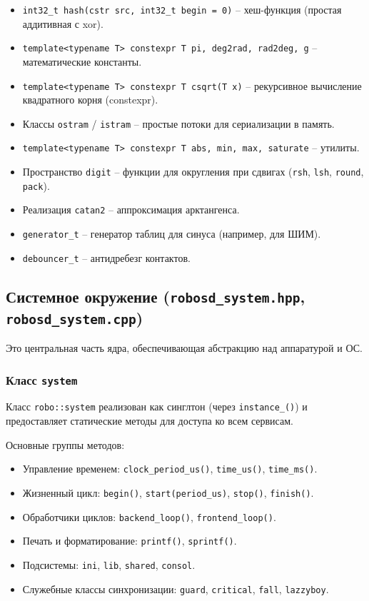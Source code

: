 \documentclass[a4paper,12pt]{article}
\begin{document}
\begin{itemize}
    \item \texttt{int32\_t hash(cstr src, int32\_t begin = 0)} -- хеш-функция (простая аддитивная с xor).
    \item \texttt{template<typename T> constexpr T pi, deg2rad, rad2deg, g} -- математические константы.
    \item \texttt{template<typename T> constexpr T csqrt(T x)} -- рекурсивное вычисление квадратного корня (constexpr).
    \item Классы \texttt{ostram} / \texttt{istram} -- простые потоки для сериализации в память.
    \item \texttt{template<typename T> constexpr T abs, min, max, saturate} -- утилиты.
    \item Пространство \texttt{digit} -- функции для округления при сдвигах (\texttt{rsh}, \texttt{lsh}, \texttt{round}, \texttt{pack}).
    \item Реализация \texttt{catan2} -- аппроксимация арктангенса.
    \item \texttt{generator\_t} -- генератор таблиц для синуса (например, для ШИМ).
    \item \texttt{debouncer\_t} -- антидребезг контактов.
\end{itemize}

\subsection{Системное окружение (\texttt{robosd\_system.hpp}, \texttt{robosd\_system.cpp})}

Это центральная часть ядра, обеспечивающая абстракцию над аппаратурой и ОС.

\subsubsection{Класс \texttt{system}}

Класс \texttt{robo::system} реализован как синглтон (через \texttt{instance\_()}) и предоставляет статические методы для доступа ко всем сервисам.

Основные группы методов:
\begin{itemize}
    \item Управление временем: \texttt{clock\_period\_us()}, \texttt{time\_us()}, \texttt{time\_ms()}.
    \item Жизненный цикл: \texttt{begin()}, \texttt{start(period\_us)}, \texttt{stop()}, \texttt{finish()}.
    \item Обработчики циклов: \texttt{backend\_loop()}, \texttt{frontend\_loop()}.
    \item Печать и форматирование: \texttt{printf()}, \texttt{sprintf()}.
    \item Подсистемы: \texttt{ini}, \texttt{lib}, \texttt{shared}, \texttt{consol}.
    \item Служебные классы синхронизации: \texttt{guard}, \texttt{critical}, \texttt{fall}, \texttt{lazzyboy}.
\end{itemize}
\end{document}
